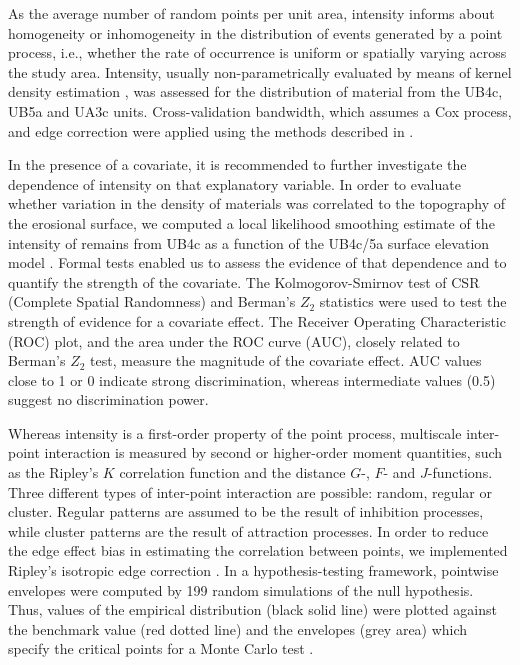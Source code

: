 \documentclass[review,authoryear,times]{elsarticle} %
\begin{document}
As the average number of random points per unit area, intensity informs about homogeneity or inhomogeneity in the distribution of events generated by a point process, i.e., whether the rate of occurrence is uniform or spatially varying across the study area. Intensity, usually non-parametrically evaluated by means of kernel density estimation \citep{Diggle1985}, was assessed for the distribution of material from the UB4c, UB5a and UA3c units. Cross-validation bandwidth, which assumes a Cox process, and edge correction were applied using the methods described in \cite{Diggle1985}.

In the presence of a covariate, it is recommended to further investigate the dependence of intensity on that explanatory variable. In order to evaluate whether variation in the density of materials was correlated to the topography of the erosional surface, we computed a local likelihood smoothing estimate of the intensity of remains from UB4c as a function of the UB4c/5a surface elevation model \citep{Baddeley2012}. Formal tests enabled us to assess the evidence of that dependence and to quantify the strength of the covariate. The Kolmogorov-Smirnov test of CSR (Complete Spatial Randomness) and Berman's $Z_2$ statistics were used to test the strength of evidence for a covariate effect. The Receiver Operating Characteristic (ROC) plot, and the area under the ROC curve (AUC), closely related to Berman's $Z_2$ test, measure the magnitude of the covariate effect. AUC values close to 1 or 0 indicate strong discrimination, whereas intermediate values (0.5) suggest no discrimination power.

Whereas intensity is a first-order property of the point process, multiscale inter-point interaction is measured by second or higher-order moment quantities, such as the Ripley's $K$ correlation function \citep{Ripley1976,Ripley1977} and the distance $G$-, $F$- and $J$-functions. Three different types of inter-point interaction are possible: random, regular or cluster. Regular patterns are assumed to be the result of inhibition processes, while cluster patterns are the result of attraction processes. In order to reduce the edge effect bias in estimating the correlation between points, we implemented Ripley's isotropic edge correction \citep{Ohser1983,Ripley1988}. In a hypothesis-testing framework, pointwise envelopes were computed by 199 random simulations of the null hypothesis. Thus, values of the empirical distribution (black solid line) were plotted against the benchmark value (red dotted line) and the envelopes (grey area) which specify the critical points for a Monte Carlo test \citep{Ripley1981}.
\end{document}
